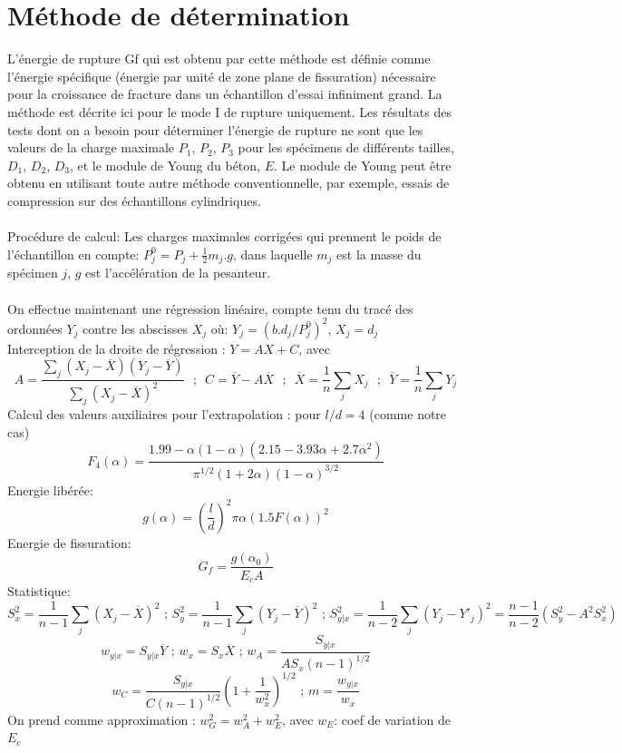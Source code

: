 \documentclass{DGC_M2_report}
\begin{document}
\section{Méthode de détermination}
L'énergie de rupture Gf qui est obtenu par cette méthode est définie comme l'énergie spécifique
(énergie par unité de zone plane de fissuration) nécessaire pour la croissance de fracture dans un
échantillon d'essai infiniment grand. La méthode est décrite ici pour le mode I de rupture
uniquement. Les résultats des tests dont on a besoin pour déterminer l'énergie de rupture ne sont
que les valeurs de la charge maximale $P_1$, $P_2$, $P_3$ pour les spécimens de différents tailles, $D_1$,
$D_2$, $D_3$, et le module de Young du béton, $E$. Le module de Young peut être obtenu en utilisant
toute autre méthode conventionnelle, par exemple, essais de compression sur des échantillons cylindriques.
\\\\
Procédure de calcul: Les charges maximales corrigées qui prennent le poids de
l'échantillon en compte: $P_{j}^{0} = P_j + \frac{1}{2}m_j.g$, dans laquelle $m_j$ est la masse du spécimen $j$, $g$ est l'accélération de la pesanteur.
\\\\
On effectue maintenant une régression linéaire, compte tenu du tracé des ordonnées $Y_j$ contre les abscisses $X_j$ où: $Y_j = (b.d_j/P_{j}^{0})^2$, $X_j = d_j$
\\
Interception de la droite de régression : $Y = AX + C$, avec
\[A=\frac{\sum_{j} (X_j-\overline{X})(Y_j-\overline{Y})}{\sum_{j} (X_j-\overline{X})^2} \text{{  };{  }} C=\overline{Y}-A\overline{X} \text{{  };{  }} \overline{X}=\frac{1}{n}\sum_{j}X_j \text{{  };{  }} \overline{Y}=\frac{1}{n}\sum_{j}Y_j\]
Calcul des valeurs auxiliaires pour l'extrapolation : pour $l/d = 4$ (comme notre cas)
\[F_4(\alpha)=\frac{1.99-\alpha(1-\alpha)(2.15-3.93\alpha+2.7\alpha^2)}{\pi^{1/2}(1+2\alpha)(1-\alpha)^{3/2}}\]
Energie libérée:
\[g(\alpha)=(\frac{l}{d})^2\pi\alpha(1.5F(\alpha))^2\]
Energie de fissuration:
\[G_f=\frac{g(\alpha_0)}{E_cA}\]
Statistique:
\[S_{x}^{2}=\frac{1}{n-1}\sum_{j} (X_j-\overline{X})^2\text{ ; }S_{y}^{2}=\frac{1}{n-1}\sum_{j} (Y_j-\overline{Y})^2\text{ ; }S_{y|x}^{2}=\frac{1}{n-2}\sum_{j} (Y_{j}-Y'_j)^{2}=\frac{n-1}{n-2}(S_{y}^{2}-A^2S_{x}^{2})\]
\[w_{y|x}=S_{y|x}\overline{Y}\text{ ; }w_x=S_x\overline{X}\text{ ; }w_A=\frac{S_{y|x}}{AS_x(n-1)^{1/2}}\]
\[w_C=\frac{S_{y|x}}{C(n-1)^{1/2}}(1+\frac{1}{w_{x}^{2}})^{1/2}\text{ ; }m=\frac{w_{y|x}}{w_x}\]
On prend comme approximation : $w_{G}^{2}=w_{A}^{2}+w_{E}^{2}$, avec $w_E$: coef de variation de $E_c$
\end{document}
